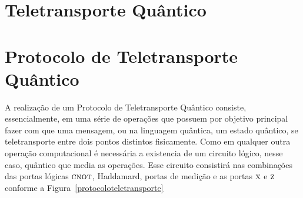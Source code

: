 \section{Teletransporte Quântico}
%
%
%


\section{Protocolo de Teletransporte Quântico}

A realização de um Protocolo de Teletransporte Quântico consiste, essencialmente, em uma série de operações que possuem por objetivo principal fazer com que uma mensagem, ou na linguagem quântica, um estado quântico, se teletransporte entre dois pontos distintos fisicamente.
Como em qualquer outra operação computacional é necessária a existencia de um circuito lógico, nesse caso, quântico que media as operações. Esse circuito consistirá nas combinações das portas lógicas \(\operatorname{\textsc{cnot}}\), Haddamard, portas de medição e as portas \(\operatorname{\textsc{x}}\) e \(\operatorname{\textsc{z}}\) conforme a Figura~\ref{protocoloteletransporte}

